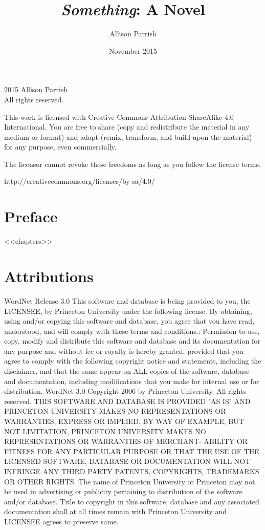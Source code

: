 \documentclass[12pt,openany]{book}
\begin{document}
\title{\textit{Something}: A Novel}
\author{Allison Parrish}
\date{November 2015}

\frontmatter
\maketitle

\pagestyle{empty}
\begingroup
\footnotesize
\parindent 0pt
\parskip \baselineskip
\textcopyright{} 2015 Allison Parrish \\
All rights reserved.

This work is licensed with Creative Commons Attribution-ShareAlike 4.0
International. You are free to share (copy and redistribute the material in any
medium or format) and adapt (remix, transform, and build upon the material) for
any purpose, even commercially.

The licensor cannot revoke these freedoms as long as you follow the license
terms.

http://creativecommons.org/licenses/by-sa/4.0/

\endgroup
\clearpage

\pagestyle{myheadings}

\chapter{Preface}


\mainmatter

<<chapters>>

\backmatter

\chapter{Attributions}

WordNet Release 3.0 This software and database is being provided to you, the
LICENSEE, by Princeton University under the following license. By obtaining,
using and/or copying this software and database, you agree that you have read,
understood, and will comply with these terms and conditions.: Permission to
use, copy, modify and distribute this software and database and its
documentation for any purpose and without fee or royalty is hereby granted,
provided that you agree to comply with the following copyright notice and
statements, including the disclaimer, and that the same appear on ALL copies of
the software, database and documentation, including modifications that you make
for internal use or for distribution. WordNet 3.0 Copyright 2006 by Princeton
University. All rights reserved. THIS SOFTWARE AND DATABASE IS PROVIDED "AS IS"
AND PRINCETON UNIVERSITY MAKES NO REPRESENTATIONS OR WARRANTIES, EXPRESS OR
IMPLIED. BY WAY OF EXAMPLE, BUT NOT LIMITATION, PRINCETON UNIVERSITY MAKES NO
REPRESENTATIONS OR WARRANTIES OF MERCHANT- ABILITY OR FITNESS FOR ANY
PARTICULAR PURPOSE OR THAT THE USE OF THE LICENSED SOFTWARE, DATABASE OR
DOCUMENTATION WILL NOT INFRINGE ANY THIRD PARTY PATENTS, COPYRIGHTS, TRADEMARKS
OR OTHER RIGHTS. The name of Princeton University or Princeton may not be used
in advertising or publicity pertaining to distribution of the software and/or
database. Title to copyright in this software, database and any associated
documentation shall at all times remain with Princeton University and LICENSEE
agrees to preserve same.
\end{document}
